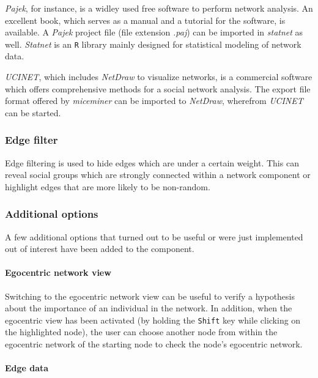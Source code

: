 \textit{Pajek}\citep{pajek}, for instance, is a widley used free software to perform network analysis. An excellent book\citep{pajek:03}, which serves as a manual and a tutorial for the software, is available. A \textit{Pajek} project file (file extension \textit{.paj}) can be imported in \textit{statnet}\citep{statnet:03} as well. \textit{Statnet} is an \lstinline|R|\citep{r:05} library mainly designed for statistical modeling of network data.

\textit{UCINET}\citep{ucinet:99}, which includes \textit{NetDraw} to visualize networks, is a commercial software which offers comprehensive methods for a social network analysis. The export file format offered by \textit{miceminer} can be imported to \textit{NetDraw}, wherefrom \textit{UCINET} can be started.

\subsubsection*{Edge filter}

Edge filtering is used to hide edges which are under a certain weight. This can reveal social groups which are strongly connected within a network component or highlight edges that are more likely to be non-random.

\subsubsection*{Additional options}

A few additional options that turned out to be useful or were just implemented out of interest have been added to the component.

\paragraph{Egocentric network view}

Switching to the egocentric network view can be useful to verify a hypothesis about the importance of an individual in the network. In addition, when the egocentric view has been activated (by holding the \lstinline|Shift| key while clicking on the highlighted node), the user can choose another node from within the egocentric network of the starting node to check the node's egocentric network.

\paragraph{Edge data}

